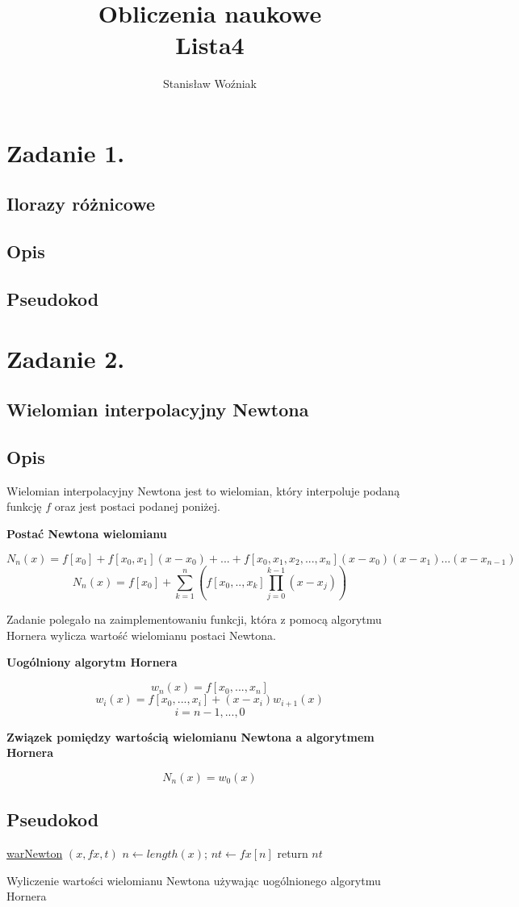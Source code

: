 \documentclass[11pt, a4paper]{article}
\title{Obliczenia naukowe\\Lista4}
\author{Stanisław Woźniak}
\date{}
\begin{document}
    \maketitle
    \section{Zadanie 1.}
    \subsection{Ilorazy różnicowe}
    \subsection{Opis}
    \subsection{Pseudokod}
    \section{Zadanie 2.}
    \subsection{Wielomian interpolacyjny Newtona}
    \subsection{Opis}
    Wielomian interpolacyjny Newtona jest to wielomian, który interpoluje podaną funkcję $f$ oraz jest postaci podanej poniżej.\\
    \centerline{\textbf{Postać Newtona wielomianu}}
    $$ N_{n}(x) = f[x_{0}] + f[x_{0}, x_{1}](x - x_{0}) + ... + f[x_{0}, x_{1}, x_{2},...,x_{n}](x - x_{0})(x - x_{1})...(x - x_{n-1})$$
    $$ N_{n}(x) = f[x_{0}] + \sum_{k=1}^{n} (f[x_{0},.., x_{k}]\prod_{j=0}^{k-1} (x - x_{j}))$$

    Zadanie polegało na zaimplementowaniu funkcji, która z pomocą algorytmu Hornera wylicza wartość wielomianu postaci Newtona.\\
    \centerline{\textbf{Uogólniony algorytm Hornera}}
    $$ w_{n}(x) = f[x_{0},...,x_{n}]$$
    $$ w_{i}(x) = f[x_{0},...,x_{i}] + (x - x_{i})w_{i+1}(x)$$
    $$i = n-1,...,0$$
    \centerline{\textbf{Związek pomiędzy wartością wielomianu Newtona a algorytmem Hornera}}
    $$ N_{n}(x) = w_{0}(x)$$


    \subsection{Pseudokod}
    \begin{algorithm}[H]

        \underline{warNewton} $(x , fx,t)$\;
        $n \gets length(x)$; $nt \gets fx[n]$\;
        return $nt$\;
        \caption{Wyliczenie wartości wielomianu Newtona używając uogólnionego algorytmu Hornera}
    \end{algorithm}
\end{document}
